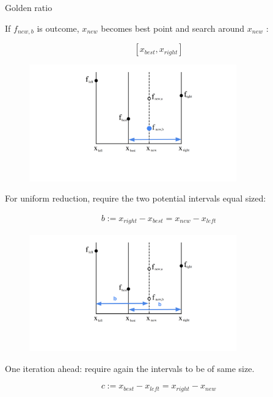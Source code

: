\documentclass[11pt,compress,t,notes=noshow, xcolor=table]{beamer}
\begin{document}
\begin{vbframe}{Golden ratio}
\framebreak 

If $f_{new, b}$ is outcome, $x_{new}$ becomes best point and search around $x_{new}$ : 

$$
    [x_{best}, x_{right}] 
$$

\begin{figure}
\includegraphics[width=0.8\textwidth]{figure_man/goldensec-2.png}\\
\end{figure}

\framebreak 

For uniform reduction, require the two potential intervals equal sized: 

\begin{eqnarray*}
    b := x_{right} - x_{best} = x_{new} - x_{left}
\end{eqnarray*}

\begin{figure}
\includegraphics[width=0.8\textwidth]{figure_man/goldensec-3.png}\\
\end{figure}

\framebreak 

One iteration ahead: require again the intervals to be of same size. 

\begin{eqnarray*}
    c := x_{best} - x_{left} = x_{right} - x_{new}
\end{eqnarray*}


\end{vbframe}
\end{document}
